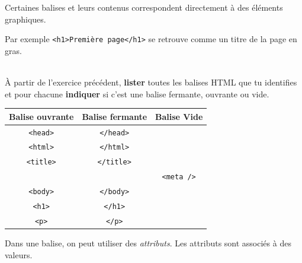 \documentclass[a4paper,17pt]{extarticle}
\newenvironment{eleve}%
{\begin{activite}\color{noiramu}\\}
{\end{activite}}
\begin{document}
Certaines balises et leurs contenus correspondent directement à des
éléments graphiques.
\begin{exemple}
    Par exemple
\texttt{\textless{}h1\textgreater{}Première\ page\textless{}/h1\textgreater{}}
se retrouve comme un titre de la page en gras.

            \end{exemple}\begin{eleve}
    À partir de l'exercice précédent, \textbf{lister} toutes les balises
HTML que tu identifies et pour chacune \textbf{indiquer} si c'est une
balise fermante, ouvrante ou vide.
        
        \end{eleve}\begin{reponse}
    \begin{longtable}[]{@{}ccc@{}}
\toprule
Balise ouvrante & Balise fermante & Balise Vide\tabularnewline
\midrule
\endhead
\texttt{\textless{}head\textgreater{}} &
\texttt{\textless{}/head\textgreater{}} &\tabularnewline
\texttt{\textless{}html\textgreater{}} &
\texttt{\textless{}/html\textgreater{}} &\tabularnewline
\texttt{\textless{}title\textgreater{}} &
\texttt{\textless{}/title\textgreater{}} &\tabularnewline
& & \texttt{\textless{}meta\ /\textgreater{}}\tabularnewline
\texttt{\textless{}body\textgreater{}} &
\texttt{\textless{}/body\textgreater{}} &\tabularnewline
\texttt{\textless{}h1\textgreater{}} &
\texttt{\textless{}/h1\textgreater{}} &\tabularnewline
\texttt{\textless{}p\textgreater{}} &
\texttt{\textless{}/p\textgreater{}} &\tabularnewline
\bottomrule
\end{longtable}

            \end{reponse}
    Dans une balise, on peut utiliser des \emph{attributs}. Les attributs
sont associés à des valeurs.
\end{document}
